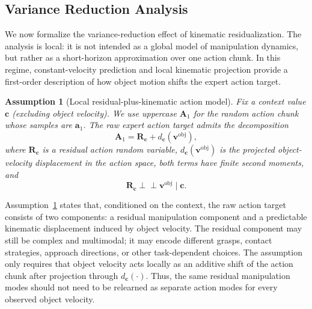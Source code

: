 \documentclass[10pt,twocolumn,letterpaper]{article}
\newtheorem{assumption}{Assumption}
\begin{document}
\subsection{Variance Reduction Analysis}
\label{subsec:variance_reduction}

We now formalize the variance-reduction effect of kinematic residualization.
The analysis is local: it is not intended as a global model of manipulation
dynamics, but rather as a short-horizon approximation over one action chunk. In
this regime, constant-velocity prediction and local kinematic projection provide
a first-order description of how object motion shifts the expert action target.

\begin{assumption}[Local residual-plus-kinematic action model]
\label{ass:local_residual_kinematic_model}
Fix a context value $\mathbf c$ (excluding object velocity). We use uppercase
$\mathbf A_1$ for the random action chunk whose samples are $\mathbf a_1$.
The raw expert action target admits the
decomposition
\begin{equation}
    \mathbf A_1
    =
    \mathbf R_{\mathbf c}
    +
    d_{\mathbf c}(\mathbf v^{\mathrm{obj}}),
    \label{eq:local_residual_kinematic_model}
\end{equation}
where $\mathbf R_{\mathbf c}$ is a residual action random variable,
$d_{\mathbf c}(\mathbf v^{\mathrm{obj}})$ is the projected object-velocity displacement in
the action space, both terms have finite second moments, and
\[
    \mathbf R_{\mathbf c}
    \perp\!\!\!\perp
    \mathbf v^{\mathrm{obj}}
    \mid
    \mathbf c.
\]
\end{assumption}

Assumption~\ref{ass:local_residual_kinematic_model} states that, conditioned on
the context, the raw action target consists of two components: a residual
manipulation component and a predictable kinematic displacement induced by
object velocity. The residual component may still be complex and multimodal; it
may encode different grasps, contact strategies, approach directions, or other
task-dependent choices. The assumption only requires that object velocity acts
locally as an additive shift of the action chunk after projection through
$d_{\mathbf c}(\cdot)$. Thus, the same residual manipulation modes should not
need to be relearned as separate action modes for every observed object
velocity.
\end{document}
